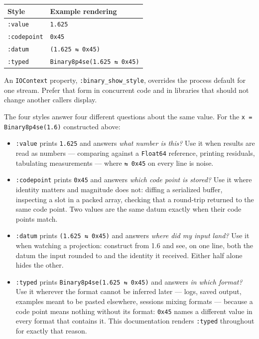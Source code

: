 \begin{table}[h]
\centering
\begin{tabulary}{\linewidth}{L L}
\toprule
Style & Example rendering \\
\toprule
\texttt{:value} & \texttt{1.625} \\
\texttt{:codepoint} & \texttt{0x45} \\
\texttt{:datum} & \texttt{(1.625 ⇆ 0x45)} \\
\texttt{:typed} & \texttt{Binary8p4se(\allowbreak{}1.625 ⇆ 0x45)} \\
\bottomrule
\end{tabulary}

\end{table}



An \texttt{IOContext} property, \texttt{:binary\_\allowbreak{}show\_\allowbreak{}style}, overrides the process default for one stream. Prefer that form in concurrent code and in libraries that should not change another caller{\textquotesingle}s display.



The four styles answer four different questions about the same value. For the \texttt{x = Binary8p4se(1.6)} constructed above:



\begin{itemize}
\item \texttt{:value} prints \texttt{1.625} and answers \emph{what number is this?} Use it when results are read as numbers — comparing against a \texttt{Float64} reference, printing residuals, tabulating measurements — where \texttt{⇆ 0x45} on every line is noise.


\item \texttt{:codepoint} prints \texttt{0x45} and answers \emph{which code point is stored?} Use it where identity matters and magnitude does not: diffing a serialized buffer, inspecting a slot in a packed array, checking that a round-trip returned to the same code point. Two values are the same datum exactly when their code points match.


\item \texttt{:datum} prints \texttt{(1.625 ⇆ 0x45)} and answers \emph{where did my input land?} Use it when watching a projection: construct from 1.6 and see, on one line, both the datum the input rounded to and the identity it received. Either half alone hides the other.


\item \texttt{:typed} prints \texttt{Binary8p4se(\allowbreak{}1.625 ⇆ 0x45)} and answers \emph{in which format?} Use it wherever the format cannot be inferred later — logs, saved output, examples meant to be pasted elsewhere, sessions mixing formats — because a code point means nothing without its format: \texttt{0x45} names a different value in every format that contains it. This documentation renders \texttt{:typed} throughout for exactly that reason.

\end{itemize}


